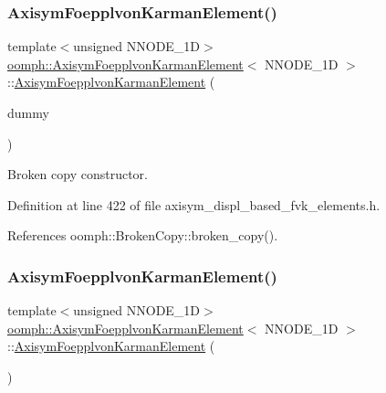\subsubsection{\texorpdfstring{Axisym\+Foepplvon\+Karman\+Element()}{AxisymFoepplvonKarmanElement()}\hspace{0.1cm}{\footnotesize\ttfamily [2/4]}}
{\footnotesize\ttfamily template$<$unsigned N\+N\+O\+D\+E\+\_\+1D$>$ \\
\hyperlink{classoomph_1_1AxisymFoepplvonKarmanElement}{oomph\+::\+Axisym\+Foepplvon\+Karman\+Element}$<$ N\+N\+O\+D\+E\+\_\+1D $>$\+::\hyperlink{classoomph_1_1AxisymFoepplvonKarmanElement}{Axisym\+Foepplvon\+Karman\+Element} (\begin{DoxyParamCaption}\item[{const \hyperlink{classoomph_1_1AxisymFoepplvonKarmanElement}{Axisym\+Foepplvon\+Karman\+Element}$<$ N\+N\+O\+D\+E\+\_\+1D $>$ \&}]{dummy }\end{DoxyParamCaption})\hspace{0.3cm}{\ttfamily [inline]}}



Broken copy constructor. 



Definition at line 422 of file axisym\+\_\+displ\+\_\+based\+\_\+fvk\+\_\+elements.\+h.



References oomph\+::\+Broken\+Copy\+::broken\+\_\+copy().

\mbox{\label{classoomph_1_1AxisymFoepplvonKarmanElement_ae05df596899638a8ee2800266412d163}} 
\subsubsection{\texorpdfstring{Axisym\+Foepplvon\+Karman\+Element()}{AxisymFoepplvonKarmanElement()}\hspace{0.1cm}{\footnotesize\ttfamily [3/4]}}
{\footnotesize\ttfamily template$<$unsigned N\+N\+O\+D\+E\+\_\+1D$>$ \\
\hyperlink{classoomph_1_1AxisymFoepplvonKarmanElement}{oomph\+::\+Axisym\+Foepplvon\+Karman\+Element}$<$ N\+N\+O\+D\+E\+\_\+1D $>$\+::\hyperlink{classoomph_1_1AxisymFoepplvonKarmanElement}{Axisym\+Foepplvon\+Karman\+Element} (\begin{DoxyParamCaption}{ }\end{DoxyParamCaption})\hspace{0.3cm}{\ttfamily [inline]}}



